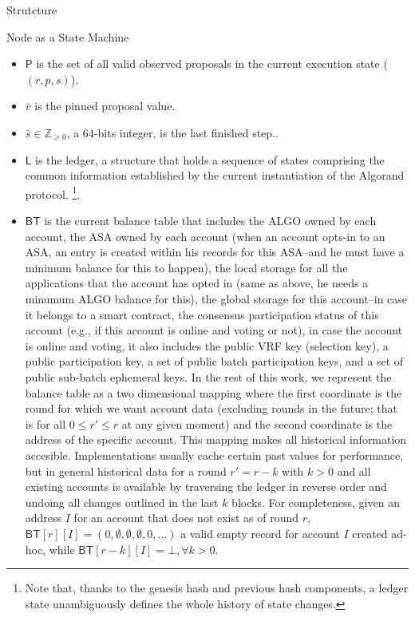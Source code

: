 \documentclass[10pt,a4paper]{article}
\begin{document}
\begin{section}{Strutcture}
\begin{subsection}{Node as a State Machine}
\begin{itemize}
    \item
    $\mathsf{P}$ is the set of all valid {\sf observed proposals}
    in the current execution state ($(r,p,s)$).
    
    \item
    $\bar{v}$ is the {\sf pinned proposal value}.
    
    \item
    $\bar{s}\in\mathbb{Z}_{\ge 0}$, a 64-bits integer, is the {\sf last finished step}..
    
    \item
    $\mathsf{L}$ is the {\sf ledger}, a structure that holds a sequence of states comprising the common
    information established by the current instantiation of the Algorand protocol.
    \footnote{Note that, thanks to the genesis hash and previous 
    hash components, a ledger state unambiguously defines the whole history of state changes.}. 
    
    \item
    $\mathsf{BT}$ is the current balance table  that includes 
      the ALGO owned by each account, 
      the ASA owned by each account (when an account opts-in to an ASA, an entry is created within his records for
        this ASA--and he must have a minimum balance for this to happen),
      the local storage for all the applications that the account has opted in (same as above, he needs a minumum
        ALGO balance for this),
      the global storage for this account--in case it belongs to a smart contract,
      the consensus participation status of this account (e.g., if this account is online and voting or not),
      in case the account is online and voting, it also includes
        the public VRF key (selection key),
        a public participation key, 
        a set of public batch participation keys, 
        and a set of public sub-batch ephemeral keys.
        In the rest of this work, we represent the balance table as a two dimensional mapping where the
        first coordinate is the round for which we want account data (excluding rounds in the future; that
        is for all $0 \leq r\prime \leq r$ at any given moment)
        and the second coordinate is the address of the specific account.
        This mapping makes all historical information accesible. Implementations usually cache certain past
        values for performance, but in general historical data for a round $r\prime = r-k$ with $k>0$ and all 
        existing accounts is available by traversing the ledger in reverse order and undoing all changes outlined 
        in the last $k$ blocks.
        For completeness, given an address $I$ for an account that does not exist as of round $r$,
        $\mathsf{BT}[r][I] = (0,\emptyset,\emptyset,\emptyset,0,...)$ a valid empty record for account $I$ created ad-hoc,
        while $\mathsf{BT}[r-k][I] = \bot, \forall k>0$.


\end{itemize}
\end{subsection}
\end{section}
\end{document}

